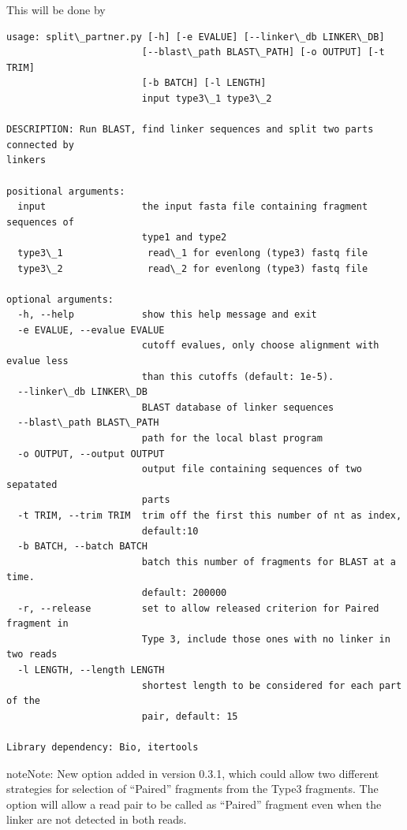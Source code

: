 \documentclass[letterpaper,10pt,english]{sphinxmanual}
\begin{document}
This will be done by 

\begin{Verbatim}[commandchars=\\\{\}]
usage: split\_partner.py [-h] [-e EVALUE] [--linker\_db LINKER\_DB]
                        [--blast\_path BLAST\_PATH] [-o OUTPUT] [-t TRIM]
                        [-b BATCH] [-l LENGTH]
                        input type3\_1 type3\_2

DESCRIPTION: Run BLAST, find linker sequences and split two parts connected by
linkers

positional arguments:
  input                 the input fasta file containing fragment sequences of
                        type1 and type2
  type3\_1               read\_1 for evenlong (type3) fastq file
  type3\_2               read\_2 for evenlong (type3) fastq file

optional arguments:
  -h, --help            show this help message and exit
  -e EVALUE, --evalue EVALUE
                        cutoff evalues, only choose alignment with evalue less
                        than this cutoffs (default: 1e-5).
  --linker\_db LINKER\_DB
                        BLAST database of linker sequences
  --blast\_path BLAST\_PATH
                        path for the local blast program
  -o OUTPUT, --output OUTPUT
                        output file containing sequences of two sepatated
                        parts
  -t TRIM, --trim TRIM  trim off the first this number of nt as index,
                        default:10
  -b BATCH, --batch BATCH
                        batch this number of fragments for BLAST at a time.
                        default: 200000
  -r, --release         set to allow released criterion for Paired fragment in
                        Type 3, include those ones with no linker in two reads
  -l LENGTH, --length LENGTH
                        shortest length to be considered for each part of the
                        pair, default: 15

Library dependency: Bio, itertools
\end{Verbatim}

\begin{notice}{note}{Note:}
New option added in version 0.3.1, which could allow two different strategies for selection of ``Paired'' fragments from the Type3 fragments. The  option will allow a read pair to be called as ``Paired'' fragment even when the linker are not detected in both reads.
\end{notice}
\end{document}
